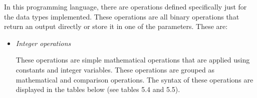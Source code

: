 \documentclass[12pt,a4paper,twoside]{report}
\begin{document}
	In this programming language, there are operations defined specifically just for the data types implemented. These operations are all binary operations that return an output directly or store it in one of the parameters. These are:
	\begin{itemize}
		\item \textit{Integer operations}
		
		These operations are simple mathematical operations that are applied using constants and integer variables. These operations are grouped as mathematical and comparison operations. The syntax of these operations are displayed in the tables below (see tables 5.4 and 5.5).


\begin{table}[H]
\centering
{}
\caption{Mathematical operations}
\label{tab:my-table}
\end{table}


\end{itemize}
\end{document}
